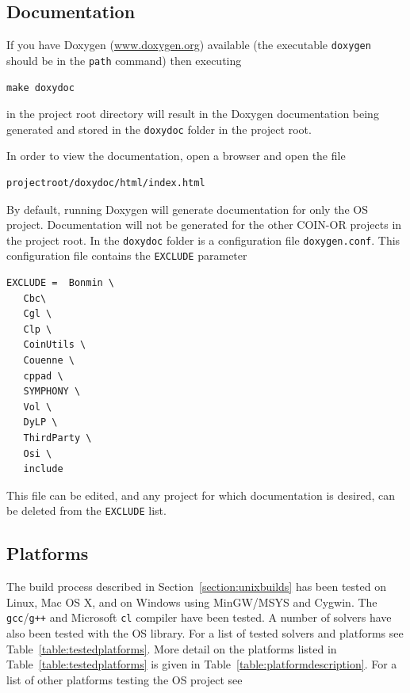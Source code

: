 \documentclass[11pt]{article}
\renewcommand{\_}{{\char"5F}}
\renewcommand{\{}{{\char"7B}}
\renewcommand{\}}{{\char"7D}}
\renewcommand{\^}{{\char"0D}}
\renewcommand{\'}{{\char"0D}}
\begin{document}
\begin{enumerate}[Step 1:]
\subsection{Documentation}\label{section:documentation}

%
If you have Doxygen  (\url{www.doxygen.org}) available (the executable {\tt doxygen} should be in the {\tt path} command) 
then executing
\begin{verbatim}
make doxydoc
\end{verbatim}
in the project root directory will result in the Doxygen documentation being generated and stored in the {\tt doxydoc} 
folder in the project root.

In order to view the documentation, open a browser and open the file
\begin{verbatim}
projectroot/doxydoc/html/index.html
\end{verbatim}

By default, running Doxygen will generate documentation for only the  OS project.  Documentation will not be generated 
for the other COIN-OR projects in the project root. In the {\tt doxydoc}  folder is a configuration file 
{\tt doxygen.conf}.  This configuration file contains the {\tt EXCLUDE} parameter

\begin{verbatim}
EXCLUDE =  Bonmin \
   Cbc\
   Cgl \
   Clp \
   CoinUtils \
   Couenne \
   cppad \
   SYMPHONY \
   Vol \
   DyLP \
   ThirdParty \
   Osi \
   include
\end{verbatim}

This file can be edited, and any project for which documentation is desired, can be deleted from the {\tt EXCLUDE} list.%





\subsection{Platforms}

The build process described in Section~\ref{section:unixbuilds} has been tested on Linux,
Mac OS X, and on Windows using  MinGW/MSYS and Cygwin.
The  {\tt gcc}/{\tt g++} and Microsoft {\tt cl} compiler have been tested.
A number of solvers have also been tested with the OS library. For a list of tested solvers and platforms see
Table~\ref{table:testedplatforms}.  More detail on the platforms listed in Table~\ref{table:testedplatforms}
is given in Table~\ref{table:platformdescription}.  For a list of other  platforms testing the OS project see 


\end{enumerate}
\end{document}
